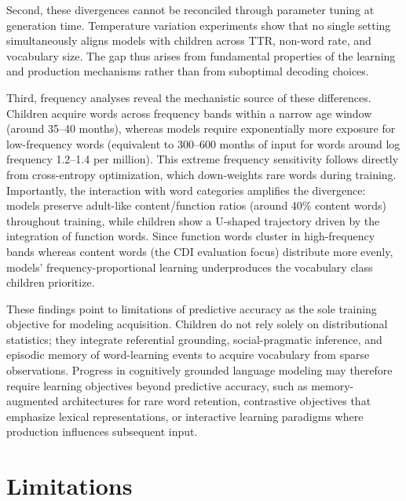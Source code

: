 Second, these divergences cannot be reconciled through parameter tuning at generation time. Temperature variation experiments show that no single setting simultaneously aligns models with children across TTR, non-word rate, and vocabulary size. The gap thus arises from fundamental properties of the learning and production mechanisms rather than from suboptimal decoding choices.


Third, frequency analyses reveal the mechanistic source of these differences. Children acquire words across frequency bands within a narrow age window (around 35–40 months), whereas models require exponentially more exposure for low-frequency words (equivalent to 300–600 months of input for words around log frequency 1.2–1.4 per million). This extreme frequency sensitivity follows directly from cross-entropy optimization, which down-weights rare words during training. Importantly, the interaction with word categories amplifies the divergence: models preserve adult-like content/function ratios (around 40\% content words) throughout training, while children show a U-shaped trajectory driven by the integration of function words. Since function words cluster in high-frequency bands whereas content words (the CDI evaluation focus) distribute more evenly, models' frequency-proportional learning underproduces the vocabulary class children prioritize.


These findings point to limitations of predictive accuracy as the sole training objective for modeling acquisition. Children do not rely solely on distributional statistics; they integrate referential grounding, social-pragmatic inference, and episodic memory of word-learning events to acquire vocabulary from sparse observations. Progress in cognitively grounded language modeling may therefore require learning objectives beyond predictive accuracy, such as memory-augmented architectures for rare word retention, contrastive objectives that emphasize lexical representations, or interactive learning paradigms where production influences subsequent input.


 
\section{Limitations}

